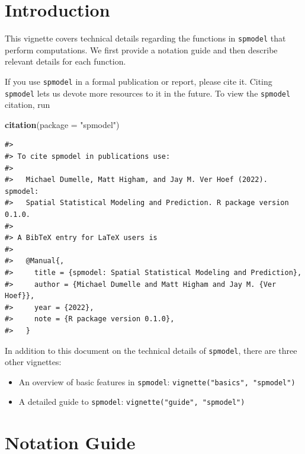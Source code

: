 \documentclass[10pt,letterpaper]{article}
\newenvironment{Shaded}{\begin{snugshade}}{\end{snugshade}}
\newcommand{\DataTypeTok}[1]{\textcolor[rgb]{0.13,0.29,0.53}{#1}}
\newcommand{\KeywordTok}[1]{\textcolor[rgb]{0.13,0.29,0.53}{\textbf{#1}}}
\newcommand{\NormalTok}[1]{#1}
\newcommand{\StringTok}[1]{\textcolor[rgb]{0.31,0.60,0.02}{#1}}
\providecommand{\tightlist}{%
  \setlength{\itemsep}{0pt}\setlength{\parskip}{0pt}}
\begin{document}
\hypertarget{introduction}{%
\section{Introduction}\label{introduction}}

This vignette covers technical details regarding the functions in
\texttt{spmodel} that perform computations. We first provide a notation
guide and then describe relevant details for each function.

If you use \texttt{spmodel} in a formal publication or report, please
cite it. Citing \texttt{spmodel} lets us devote more resources to it in
the future. To view the \texttt{spmodel} citation, run

\begin{Shaded}
\begin{Highlighting}[]
\KeywordTok{citation}\NormalTok{(}\DataTypeTok{package =} \StringTok{"spmodel"}\NormalTok{)}
\end{Highlighting}
\end{Shaded}

\begin{verbatim}
#> 
#> To cite spmodel in publications use:
#> 
#>   Michael Dumelle, Matt Higham, and Jay M. Ver Hoef (2022). spmodel:
#>   Spatial Statistical Modeling and Prediction. R package version 0.1.0.
#> 
#> A BibTeX entry for LaTeX users is
#> 
#>   @Manual{,
#>     title = {spmodel: Spatial Statistical Modeling and Prediction},
#>     author = {Michael Dumelle and Matt Higham and Jay M. {Ver Hoef}},
#>     year = {2022},
#>     note = {R package version 0.1.0},
#>   }
\end{verbatim}

In addition to this document on the technical details of
\texttt{spmodel}, there are three other vignettes:

\begin{itemize}
\tightlist
\item
  An overview of basic features in \texttt{spmodel}:
  \texttt{vignette("basics",\ "spmodel")}
\item
  A detailed guide to \texttt{spmodel}:
  \texttt{vignette("guide",\ "spmodel")}
\end{itemize}

\hypertarget{notation-guide}{%
\section{Notation Guide}\label{notation-guide}}
\end{document}
